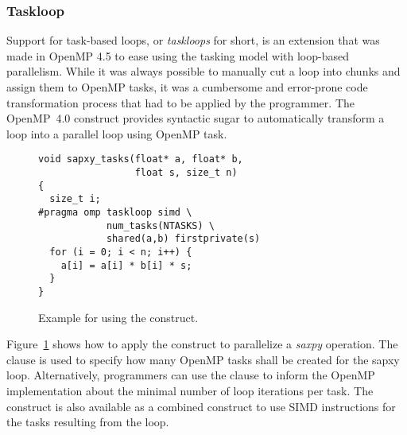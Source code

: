 



\subsubsection{Taskloop}
\label{sec:Taskloop}

Support for task-based loops, or \emph{taskloops} for short, is  an extension that was made in OpenMP 4.5 to ease using the tasking model with loop-based parallelism.
While it was always possible to manually cut a loop into chunks and assign them to OpenMP tasks, it was a cumbersome and error-prone code transformation process that had to be applied by the programmer.
The OpenMP~4.0  construct provides syntactic sugar to automatically transform a loop into a parallel loop using OpenMP task.

\begin{figure}
\begin{verbatim}
void sapxy_tasks(float* a, float* b,
                 float s, size_t n)
{
  size_t i;
#pragma omp taskloop simd \
            num_tasks(NTASKS) \
            shared(a,b) firstprivate(s)
  for (i = 0; i < n; i++) {
    a[i] = a[i] * b[i] * s;
  }
}
\end{verbatim}
\caption{Example for using the  construct.\label{fig:TaskloopExample}}
\end{figure}

Figure~\ref{fig:TaskloopExample} shows how to apply the  construct to parallelize a \emph{saxpy} operation.
The  clause is used to specify how many OpenMP tasks shall be created for the sapxy loop.
Alternatively, programmers can use the \code{grainsize} clause to inform the OpenMP implementation about the minimal number of loop iterations per task.
The \code{taskloop} construct is also available as a combined construct to use SIMD instructions for the tasks resulting from the loop.
